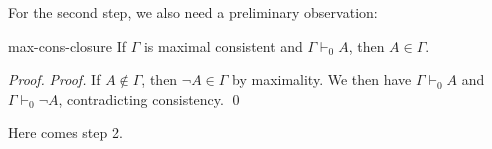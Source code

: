 


For the second step,
we also need a preliminary observation:

\begin{lemma}{}{max-cons-closure}
  If $\Gamma$ is maximal consistent and $\Gamma \vdash_0 A$, then $A \in \Gamma$.
\end{lemma}
\begin{proof}
  \emph{Proof.}
  If $A \notin \Gamma$, then $\neg A \in \Gamma$ by maximality.
  We then have $\Gamma \vdash_0 A$ and $\Gamma \vdash_0 \neg A$, contradicting consistency.
  \qed
\end{proof}



Here comes step 2.

